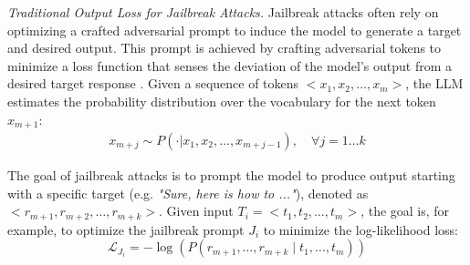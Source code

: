 \noindent\textit{Traditional Output Loss for Jailbreak Attacks. }
Jailbreak attacks often rely on optimizing a crafted adversarial prompt to induce the model to generate a target and desired output. This prompt is achieved by crafting adversarial tokens to minimize a loss function that senses the deviation of the model's output from a desired target response \cite{liu2024autodan}.  %
Given a sequence of tokens $< x_1, x_2, \dots, x_m >$, the LLM estimates the probability distribution over the vocabulary for the next token $x_{m+1}$:
\begin{align}
    x_{m+j} \sim P(\cdot | x_1, x_2, \dots, x_{m+j-1}), \quad \forall j = 1 \dots k
\end{align}

The goal of jailbreak attacks is to prompt the model to produce output starting with a specific target (e.g. \textit{"Sure, here is how to ..."}),  denoted as  $< r_{m+1}, r_{m+2}, \dots, r_{m+k} >$. Given input $T_i =  < t_1, t_2, \dots, t_m >$, the goal is, for example, to optimize the jailbreak prompt $J_i$ to %
minimize the log-likelihood loss: 
\begin{equation}
    \mathcal{L}_{J_i} = -\log\left(P\left(r_{m+1}, \dots, r_{m+k} \mid t_1, \dots, t_m \right)\right)
\end{equation}






